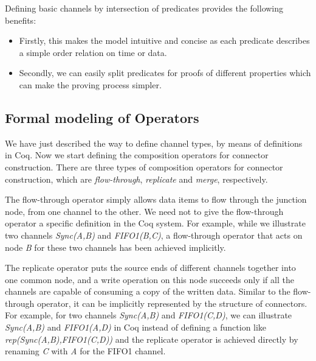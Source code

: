 \documentclass[preprint,3p]{elsarticle}
\begin{document}

Defining basic channels by intersection of predicates provides the following benefits:
\begin{itemize}
\item Firstly, this makes the model intuitive and concise as each predicate describes a simple order relation on time or data.
\item Secondly, we can easily split predicates for proofs of different properties which can make the proving process simpler.
\end{itemize}

\subsection{Formal modeling of Operators}
We have just described the way to define channel types, by means of definitions in Coq. Now we start defining the composition operators for connector construction. There are three types of composition operators for connector construction, which are \emph{flow-through}, \emph{replicate} and \emph{merge}, respectively.

The flow-through operator simply allows data items to flow through the junction node, from one channel to the other. We need not to give the flow-through operator a specific definition in the Coq system. For example, while we illustrate two channels \emph{Sync(A,B)} and \emph{FIFO1(B,C)}, a flow-through operator that acts on node \emph{B} for these two channels has been achieved implicitly.

The replicate operator puts the source ends of different channels together into one common node, and a write operation on this node succeeds only if all the channels are capable of consuming a copy of the written data. %
Similar to the flow-through operator, it can be implicitly represented by the structure of connectors. For example, for two channels \emph{Sync(A,B)} and \emph{FIFO1(C,D)}, we can illustrate \emph{Sync(A,B)} and \emph{FIFO1(A,D)} in Coq instead of defining a function like \emph{rep(Sync(A,B),FIFO1(C,D))} and the replicate operator is achieved directly by renaming \emph{C} with \emph{A} for the FIFO1 channel.
\end{document}

